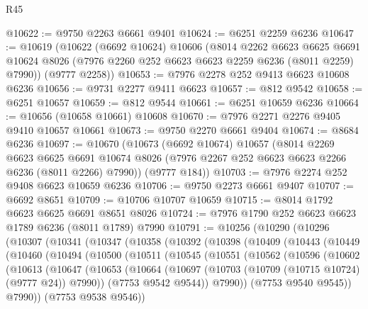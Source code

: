 \begin{lexlean}{R45}
\begin{coremodule}
{@10622 := @9750 @2263 @6661 @9401
@10624 := @6251 @2259 @6236
@10647 := @10619
    (@10622
      (@6692 @10624)
      @10606
      (@8014
        @2262
        @6623
        @6625
        @6691
        @10624
        @8026
        (@7976 @2260 @252 @6623 @6623 @2259 @6236 (@8011 @2259) @7990))
      (@9777 @2258))
@10653 := @7976 @2278 @252 @9413 @6623 @10608 @6236
@10656 := @9731 @2277 @9411 @6623
@10657 := @812 @9542
@10658 := @6251 @10657
@10659 := @812 @9544
@10661 := @6251 @10659 @6236
@10664 := @10656 (@10658 @10661) @10608
@10670 := @7976 @2271 @2276 @9405 @9410 @10657 @10661
@10673 := @9750 @2270 @6661 @9404
@10674 := @8684 @6236
@10697 := @10670
    (@10673
      (@6692 @10674)
      @10657
      (@8014
        @2269
        @6623
        @6625
        @6691
        @10674
        @8026
        (@7976 @2267 @252 @6623 @6623 @2266 @6236 (@8011 @2266) @7990))
      (@9777 @184))
@10703 := @7976 @2274 @252 @9408 @6623 @10659 @6236
@10706 := @9750 @2273 @6661 @9407
@10707 := @6692 @8651
@10709 := @10706 @10707 @10659
@10715 := @8014 @1792 @6623 @6625 @6691 @8651 @8026
@10724 := @7976 @1790 @252 @6623 @6623 @1789 @6236 (@8011 @1789) @7990
@10791 := @10256
    (@10290
      (@10296
        (@10307
          (@10341
            (@10347
              (@10358
                (@10392
                  (@10398
                    (@10409
                      (@10443
                        (@10449
                          (@10460
                            (@10494
                              (@10500
                                (@10511
                                  (@10545
                                    (@10551
                                      (@10562
                                        (@10596
                                          (@10602
                                            (@10613
                                              (@10647
                                                (@10653
                                                  (@10664
                                                    (@10697
                                                      (@10703
                                                        (@10709 (@10715 @10724) (@9777 @24))
                                                        @7990))
                                                    (@7753 @9542 @9544))
                                                  @7990))
                                              (@7753 @9540 @9545))
                                            @7990))
                                        (@7753 @9538 @9546))
}
\end{coremodule}
\end{lexlean}
